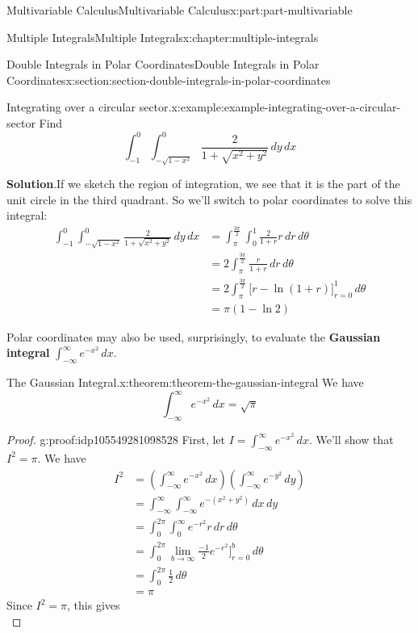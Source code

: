 \documentclass[twoside,10pt,]{book}
\newcommand{\blocktitlefont}{\relax}
\newcommand{\terminology}[1]{\textbf{#1}}
\numberwithin{equation}{part}
\begin{document}
\begin{partptx}{Multivariable Calculus}{}{Multivariable Calculus}{}{}{x:part:part-multivariable}
\begin{chapterptx}{Multiple Integrals}{}{Multiple Integrals}{}{}{x:chapter:multiple-integrals}
\begin{sectionptx}{Double Integrals in Polar Coordinates}{}{Double Integrals in Polar Coordinates}{}{}{x:section:section-double-integrals-in-polar-coordinates}
\begin{example}{Integrating over a circular sector.}{x:example:example-integrating-over-a-circular-sector}
Find%
\begin{equation*}
\int_{-1}^{0}\int_{-\sqrt{1-x^{2}}}^{0}\frac{2}{1+\sqrt{x^{2} + y^{2}}}\,dy\,dx
\end{equation*}
%
\par\smallskip%
\noindent\textbf{\blocktitlefont Solution}.\hypertarget{g:solution:idp105549281094560}{}\quad{}If we sketch the region of integration, we see that it is the part of the unit circle in the third quadrant. So we'll switch to polar coordinates to solve this integral:%
\begin{align*}
\int_{-1}^{0}\int_{-\sqrt{1-x^{2}}}^{0}\frac{2}{1+\sqrt{x^{2} + y^{2}}}\,dy\,dx & = \int_{\pi}^{\frac{3\pi}{2}}\int_{0}^{1}\frac{2}{1+r}r\,dr\,d\theta \\
& = 2\int_{\pi}^{\frac{3\pi}{2}} \frac{r}{1+r}\,dr\,d\theta \\
& = 2\int_{\pi}^{\frac{3\pi}{2}} \bigg[r - \ln(1+r)\bigg]_{r=0}^{1}\,d\theta \\
& = \pi(1-\ln2) 
\end{align*}
%
\end{example}
Polar coordinates may also be used, surprisingly, to evaluate the \terminology{Gaussian integral} \(\int_{-\infty}^{\infty}e^{-x^{2}}\,dx\).%
\begin{theorem}{The Gaussian Integral.}{}{x:theorem:theorem-the-gaussian-integral}%
We have%
\begin{equation*}
\int_{-\infty}^{\infty}e^{-x^{2}}\,dx = \sqrt{\pi}
\end{equation*}
%
\end{theorem}
\begin{proof}{}{g:proof:idp105549281098528}
First, let \(I = \int_{-\infty}^{\infty}e^{-x^{2}}\,dx\). We'll show that \(I^{2} = \pi\). We have%
\begin{align*}
I^{2} & = \left(\int_{-\infty}^{\infty}e^{-x^{2}}\,dx\right)\left(\int_{-\infty}^{\infty}e^{-y^{2}}\,dy\right) \\
& = \int_{-\infty}^{\infty}\int_{-\infty}^{\infty}e^{-(x^{2} + y^{2})}\,dx\,dy \\
& = \int_{0}^{2\pi}\int_{0}^{\infty}e^{-r^{2}}r\,dr\,d\theta \\
& = \int_{0}^{2\pi} \lim_{b\to\infty}\frac{-1}{2}e^{-r^{2}}\bigg]_{r=0}^{b}\,d\theta \\
& = \int_{0}^{2\pi} \frac{1}{2}\,d\theta \\
& = \pi 
\end{align*}
Since \(I^{2} = \pi\), this gives%
\begin{equation*}

\end{equation*}
\end{proof}
\end{sectionptx}
\end{chapterptx}
\end{partptx}
\end{document}
